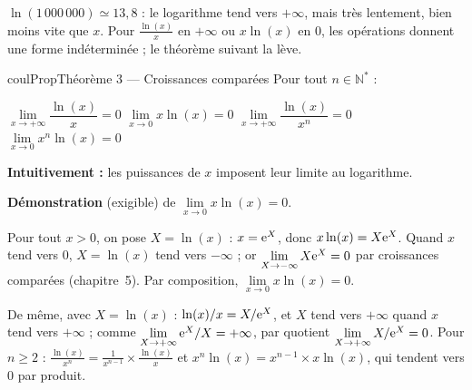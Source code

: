 \documentclass[11pt,a4paper]{article}
\makeatletter
\newcommand{\Ns}{\mathbb{N}^{*}}
\renewcommand{\approx}{\simeq}
\newcounter{lycee@signet}
\newcommand{\signet}[3][]{\stepcounter{lycee@signet}%
  \edef\lycee@dest{\if\relax\detokenize{#1}\relax
    signet.\arabic{lycee@signet}\else#1\fi}%
  \hypertarget{\lycee@dest}{}\bookmark[level=#2,dest=\lycee@dest]{#3}}
\newenvironment{proprietebox}[1][Propriété]%
  {\begin{boitecours}[phantom={\signet{2}{#1}}]{coulProp}{#1}}{\end{boitecours}}
\makeatother
\begin{document}
$\ln(1\,000\,000)\approx 13{,}8$ : le logarithme tend vers $+\infty$, mais très
lentement, bien moins vite que $x$. Pour $\frac{\ln(x)}{x}$ en $+\infty$ ou $x\ln(x)$
en $0$, les opérations donnent une forme indéterminée ; le théorème suivant la lève.

\begin{proprietebox}[Théorème 3 --- Croissances comparées]
Pour tout $n\in\Ns$ :
\begin{center}
$\lim\limits_{x\to+\infty}\dfrac{\ln(x)}{x}=0$ \qquad
$\lim\limits_{x\to 0}x\ln(x)=0$ \qquad
$\lim\limits_{x\to+\infty}\dfrac{\ln(x)}{x^{n}}=0$ \qquad
$\lim\limits_{x\to 0}x^{n}\ln(x)=0$
\end{center}
\textbf{Intuitivement :} les puissances de $x$ imposent leur limite au logarithme.

\smallskip
\textbf{\color{coulMeth}Démonstration} (exigible) de $\lim\limits_{x\to 0}x\ln(x)=0$.

\smallskip
Pour tout $x>0$, on pose $X=\ln(x)$ : $x=\mathrm{e}^{X}$, donc $x\ln(x)=X\mathrm{e}^{X}$. Quand $x$
tend vers $0$, $X=\ln(x)$ tend vers $-\infty$ ; or
$\lim\limits_{X\to-\infty}X\mathrm{e}^{X}=0$ par croissances comparées (chapitre~5). Par
composition, $\lim\limits_{x\to 0}x\ln(x)=0$.

\smallskip
De même, avec $X=\ln(x)$ : $\ln(x)/x=X/\mathrm{e}^{X}$, et $X$ tend vers
$+\infty$ quand $x$ tend vers $+\infty$ ; comme
$\lim\limits_{X\to+\infty}\mathrm{e}^{X}/X=+\infty$, par quotient
$\lim\limits_{X\to+\infty}X/\mathrm{e}^{X}=0$. Pour $n\geq 2$ :
$\frac{\ln(x)}{x^{n}}=\frac{1}{x^{n-1}}\times\frac{\ln(x)}{x}$ et
$x^{n}\ln(x)=x^{n-1}\times x\ln(x)$, qui tendent vers $0$ par produit.

\end{proprietebox}
\end{document}
